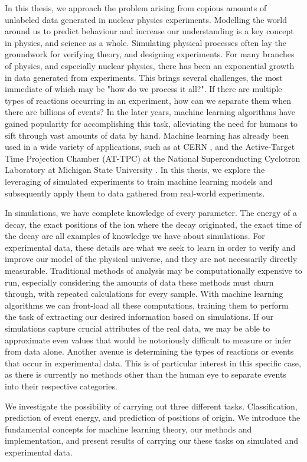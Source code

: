 \noindent In this thesis, we approach the problem arising from copious amounts of unlabeled data
generated in nuclear physics experiments. Modelling the world around us to predict behaviour and increase 
our understanding is a key concept in physics, and science as a whole. Simulating physical processes often 
lay the groundwork for verifying theory, and designing experiments. For many branches of physics, 
and especially nuclear physics, there has been an exponential growth in data generated from experiments. 
This brings several challenges, the most immediate of which may be "how do we process it all?". If there are 
multiple types of
reactions occurring in an experiment, how can we separate them when there are billions of events?
In the later years, machine learning algorithms have gained popularity for accomplishing this task,
alleviating the need for humans to sift through vast amounts of data by hand. 
Machine learning has already been used in a wide variety of applications, such as at CERN \cite{Arpaia2021},
and the Active-Target Time Projection Chamber (AT-TPC) at the National Superconducting Cyclotron Laboratory
at Michigan State University \cite{Kuchera2019}. In this thesis, we explore the leveraging of simulated experiments to train machine learning models and subsequently
apply them to data gathered from real-world experiments.


\noindent In simulations, we have complete knowledge of every parameter. The energy of a decay, the exact positions
of the ion where the decay originated, the exact time of the decay are all examples of knowledge we have about
simulations. For experimental data, these details are what we seek to learn in order to verify and improve our
model of the physical universe, and they are not necessarily directly measurable.
Traditional methods of analysis may be computationally expensive to run, especially considering the
amounts of data these methods must churn through, with repeated calculations for every sample.
With machine learning algorithms we can front-load all these computations, training them to perform
the task of extracting our desired information based on simulations. If our simulations capture crucial
attributes of the real data, we may be able to approximate even values that would be notoriously difficult 
to measure or infer from data alone. Another avenue is determining the types of reactions or events that
occur in experimental data. This is of particular interest in this specific case, as there is currently no methods
other than the human eye to separate events into their respective categories. 

\noindent We investigate the possibility of carrying out three different tasks. Classification, prediction of event energy, and prediction of
positions of origin. We introduce the fundamental concepts for machine learning theory, our methods and
implementation, and present results of carrying our these tasks on simulated and experimental data.